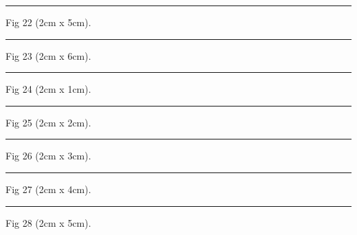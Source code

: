 \documentclass[a4paper,11pt]{article}
\begin{document}
\begin{swarmwrap}%
  \begin{minipage}[t]{2cm}
    \centering
    \rule{\linewidth}{5cm}
    {\footnotesize Fig 22 (2cm x 5cm).}
  \end{minipage}%
\end{swarmwrap}%
\swarmwrapnext
\lipsum[22]%

\begin{swarmwrap}%
  \begin{minipage}[t]{2cm}
    \centering
    \rule{\linewidth}{6cm}
    {\footnotesize Fig 23 (2cm x 6cm).}
  \end{minipage}%
\end{swarmwrap}%
\swarmwrapnext
\lipsum[23]%

\begin{swarmwrap}%
  \begin{minipage}[t]{2cm}
    \centering
    \rule{\linewidth}{1cm}
    {\footnotesize Fig 24 (2cm x 1cm).}
  \end{minipage}%
\end{swarmwrap}%
\swarmwrapnext
\lipsum[24]%

\begin{swarmwrap}%
  \begin{minipage}[t]{2cm}
    \centering
    \rule{\linewidth}{2cm}
    {\footnotesize Fig 25 (2cm x 2cm).}
  \end{minipage}%
\end{swarmwrap}%
\swarmwrapnext
\lipsum[25]%

\begin{swarmwrap}%
  \begin{minipage}[t]{2cm}
    \centering
    \rule{\linewidth}{3cm}
    {\footnotesize Fig 26 (2cm x 3cm).}
  \end{minipage}%
\end{swarmwrap}%
\swarmwrapnext
\lipsum[26]%

\begin{swarmwrap}%
  \begin{minipage}[t]{2cm}
    \centering
    \rule{\linewidth}{4cm}
    {\footnotesize Fig 27 (2cm x 4cm).}
  \end{minipage}%
\end{swarmwrap}%
\swarmwrapnext
\lipsum[27]%

\begin{swarmwrap}%
  \begin{minipage}[t]{2cm}
    \centering
    \rule{\linewidth}{5cm}
    {\footnotesize Fig 28 (2cm x 5cm).}
  \end{minipage}%
\end{swarmwrap}%
\swarmwrapnext
\lipsum[28]%
\end{document}

